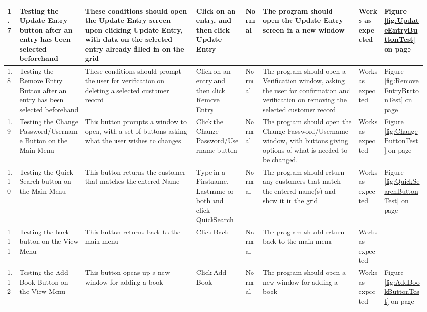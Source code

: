 \begin{landscape}
\begin{center}
\begin{longtable}{|p{1.5cm}|p{2cm}|p{2.5cm}|p{2.5cm}|p{2cm}|p{2cm}|p{2cm}|p{2cm}|}
        1.7 & Testing the Update Entry button after an entry has been selected beforehand & These conditions should open the Update Entry screen upon clicking Update Entry, with data on the selected entry already filled in on the grid & Click on an entry, and then click Update Entry & Normal & The program should open the Update Entry screen in a new window & Works as expected & Figure \ref{fig:UpdateEntryButtonTest} on page \pageref{fig:UpdateEntryButtonTest} \\ \hline
        1.8 & Testing the Remove Entry Button after an entry has been selected beforehand & These conditions should prompt the user for verification on deleting a selected customer record & Click on an entry and then click Remove Entry & Normal & The program should open a Verification window, asking the user for confirmation and verification on removing the selected customer record & Works as expected & Figure \ref{fig:RemoveEntryButtonTest} on page \pageref{fig:RemoveEntryButtonTest} \\ \hline
\rowcolor{lightgray} 1.9 & Testing the Change Password/Username Button on the Main Menu & This button prompts a window to open, with a set of buttons asking what the user wishes to changes & Click the Change Password/Username button & Normal & The program should open the Change Password/Username window, with buttons giving options of what is needed to be changed. & Works as expected & Figure \ref{fig:ChangeButtonTest} on page \pageref{fig:ChangeButtonTest} \\ \hline
\rowcolor{lightgray} 1.10 & Testing the Quick Search button on the Main Menu & This button returns the customer that matches the entered Name & Type in a Firstname, Lastname or both and click QuickSearch & Normal & The program should return any customers that match the entered name(s) and show it in the grid & Works as expected & Figure \ref{fig:QuickSearchButtonTest} on page \pageref{fig:QuickSearchButtonTest} \\ \hline
        1.11 & Testing the back button on the View Menu & This button returns back to the main menu & Click Back & Normal & The program should return back to the main menu & Works as expected & \\ \hline
        1.12 & Testing the Add Book Button on the View Menu & This button opens up a new window for adding a book & Click Add Book & Normal & The program should open a new window for adding a book & Works as expected & Figure \ref{fig:AddBookButtonTest} on page \pageref{fig:AddBookButtonTest} \\ \hline

\end{longtable}
\end{center}
\end{landscape}
